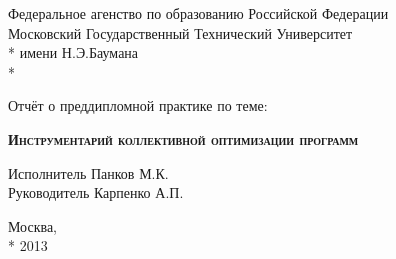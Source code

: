 \begin{titlepage}
    \newpage
    
    \begin{center}
        Федеральное агенство по образованию Российской Федерации \\
        Московский Государственный Технический Университет \\*
        имени Н.Э.Баумана \\*
        \vspace{-12mm}
        \begin{figure}[h]
        \end{figure}
        \vspace{-16mm}
        \hrulefill
    \end{center}
    \begin{center}
        \Large Отчёт о преддипломной практике по теме:
    \end{center}
    
    \vspace{2.5em}
    
    \begin{center}
        \textsc{\textbf{Инструментарий коллективной оптимизации программ}}
    \end{center}
    
    \vspace{6em}
    
    \begin{flushleft}
        \hspace{8.5cm}Исполнитель \hrulefill Панков М.К. \\
        \vspace{1.5em}
        \hspace{8.5cm}Руководитель \hrulefill Карпенко А.П.\\
    \end{flushleft}
    
    \vspace{\fill}
    
    \begin{center}
        Москва, \\*
        2013
    \end{center}

\end{titlepage}